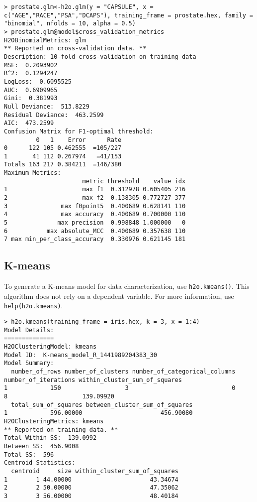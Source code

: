 {{\begin{lstlisting}[style=R]
> prostate.glm<-h2o.glm(y = "CAPSULE", x = c("AGE","RACE","PSA","DCAPS"), training_frame = prostate.hex, family = "binomial", nfolds = 10, alpha = 0.5)
> prostate.glm@model$cross_validation_metrics
H2OBinomialMetrics: glm
** Reported on cross-validation data. **
Description: 10-fold cross-validation on training data
MSE:  0.2093902
R^2:  0.1294247
LogLoss:  0.6095525
AUC:  0.6909965
Gini:  0.381993
Null Deviance:  513.8229
Residual Deviance:  463.2599
AIC:  473.2599
Confusion Matrix for F1-optimal threshold:
         0   1    Error      Rate
0      122 105 0.462555  =105/227
1       41 112 0.267974   =41/153
Totals 163 217 0.384211  =146/380
Maximum Metrics:
                      metric threshold    value idx
1                     max f1  0.312978 0.605405 216
2                     max f2  0.138305 0.772727 377
3               max f0point5  0.400689 0.628141 110
4               max accuracy  0.400689 0.700000 110
5              max precision  0.998848 1.000000   0
6           max absolute_MCC  0.400689 0.357638 110
7 max min_per_class_accuracy  0.330976 0.621145 181
\end{lstlisting}


\subsection{K-means}

To generate a K-means model for data characterization, use {\texttt{h2o.kmeans()}}. This algorithm does not rely on a dependent variable. For more information, use {\texttt{help(h2o.kmeans)}}.

\waterExampleInR
\medskip
\begin{lstlisting}[style=R]
> h2o.kmeans(training_frame = iris.hex, k = 3, x = 1:4)
Model Details:
==============
H2OClusteringModel: kmeans
Model ID:  K-means_model_R_1441989204383_30
Model Summary:
  number_of_rows number_of_clusters number_of_categorical_columns number_of_iterations within_cluster_sum_of_squares
1            150                  3                             0                    8                     139.09920
  total_sum_of_squares between_cluster_sum_of_squares
1            596.00000                      456.90080
H2OClusteringMetrics: kmeans
** Reported on training data. **
Total Within SS:  139.0992
Between SS:  456.9008
Total SS:  596
Centroid Statistics:
  centroid     size within_cluster_sum_of_squares
1        1 44.00000                      43.34674
2        2 50.00000                      47.35062
3        3 56.00000                      48.40184
\end{lstlisting}




}}
